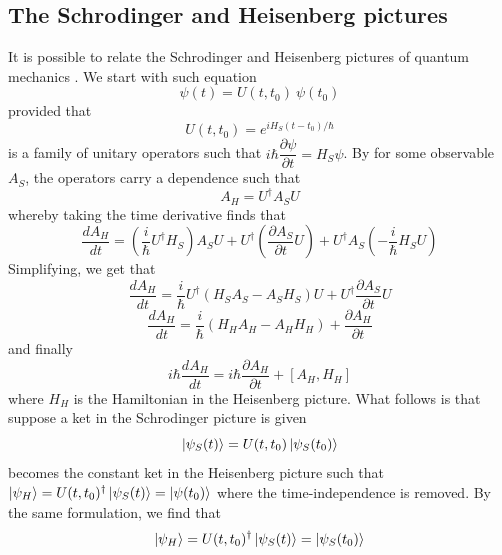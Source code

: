 \documentclass[a4paper]{article}
\theoremstyle{definition}
\begin{document}
		\subsection{The Schrodinger and Heisenberg pictures}
		It is possible to relate the Schrodinger and Heisenberg pictures of quantum mechanics \cite{deGossonshe}. We start with such equation
		\begin{equation}
			\psi(t)=U(t,t_0)~\psi(t_0)
		\end{equation}
		provided that
		\begin{equation}
			U(t,t_0)=e^{iH_S(t-t_0)/\hbar}
		\end{equation}
		is a family of unitary operators such that $i\hbar\dfrac{\partial\psi}{\partial t}=H_S\psi$. By for some observable $A_S$, the operators carry a dependence such that
		\begin{equation}
			A_H=U^\dagger A_SU
		\end{equation}
		whereby taking the time derivative finds that
		\begin{equation}
			\frac{dA_H}{dt}=\left(\frac{i}{\hbar}U^\dagger H_S\right)A_SU+U^\dagger\left(\frac{\partial A_S}{\partial t}U\right)+U^\dagger A_S\left(-\frac{i}{\hbar}H_SU\right)
		\end{equation}
		Simplifying, we get that
		\begin{equation}
			\frac{dA_H}{dt}=\frac{i}{\hbar}U^\dagger\left(H_SA_S-A_SH_S\right)U+U^\dagger\frac{\partial A_S}{\partial t}U
		\end{equation}
		\begin{equation}
			\frac{dA_H}{dt}=\frac{i}{\hbar}(H_HA_H-A_HH_H)+\frac{\partial A_H}{\partial t}
		\end{equation}
		and finally
		\begin{equation}
			i\hbar\frac{dA_H}{dt}=i\hbar\frac{\partial A_H}{\partial t}+[A_H,H_H]
		\end{equation}
		where $H_H$ is the Hamiltonian in the Heisenberg picture. What follows is that suppose a ket in the Schrodinger picture is given
		\begin{equation}
			\ket{\psi_S(t)}=U(t,t_0)\ket{\psi_S(t_0)}
		\end{equation}
		becomes the constant ket in the Heisenberg picture such that $\ket{\psi_H}=U(t,t_0)^\dagger\ket{\psi_S(t)}=\ket{\psi(t_0)}$ where the time-independence is removed. By the same formulation, we find that
		\begin{equation}
			\ket{\psi_H}=U(t,t_0)^\dagger\ket{\psi_S(t)}=\ket{\psi_S(t_0)}
		\end{equation}
\end{document}
